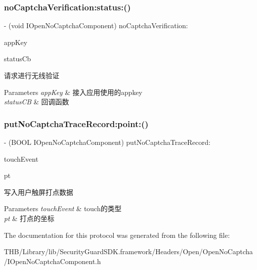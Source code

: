 \subsubsection{\texorpdfstring{no\+Captcha\+Verification\+:status\+:()}{noCaptchaVerification:status:()}}
{\footnotesize\ttfamily -\/ (void I\+Open\+No\+Captcha\+Component) no\+Captcha\+Verification\+: \begin{DoxyParamCaption}\item[{(N\+S\+String $\ast$)}]{app\+Key }\item[{status:(void($^\wedge$)(N\+S\+Integer status, C\+G\+Point pt1, C\+G\+Point pt2, N\+S\+String $\ast$token, N\+S\+String $\ast$sig, N\+S\+String $\ast$session\+ID))}]{status\+Cb }\end{DoxyParamCaption}}

请求进行无线验证


\begin{DoxyParams}{Parameters}
{\em app\+Key} & 接入应用使用的appkey \\
\hline
{\em status\+CB} & 回调函数 \\
\hline
\end{DoxyParams}
\mbox{\label{protocol_i_open_no_captcha_component_01-p_a2f67e21ab8dbcad39dff803646c6e132}} 
\subsubsection{\texorpdfstring{put\+No\+Captcha\+Trace\+Record\+:point\+:()}{putNoCaptchaTraceRecord:point:()}}
{\footnotesize\ttfamily -\/ (B\+O\+OL I\+Open\+No\+Captcha\+Component) put\+No\+Captcha\+Trace\+Record\+: \begin{DoxyParamCaption}\item[{(N\+S\+Integer)}]{touch\+Event }\item[{point:(C\+G\+Point)}]{pt }\end{DoxyParamCaption}}

写入用户触屏打点数据


\begin{DoxyParams}{Parameters}
{\em touch\+Event} & touch的类型 \\
\hline
{\em pt} & 打点的坐标 \\
\hline
\end{DoxyParams}


The documentation for this protocol was generated from the following file\+:\begin{DoxyCompactItemize}
\item 
T\+H\+B/\+Library/lib/\+Security\+Guard\+S\+D\+K.\+framework/\+Headers/\+Open/\+Open\+No\+Captcha/I\+Open\+No\+Captcha\+Component.\+h\end{DoxyCompactItemize}

